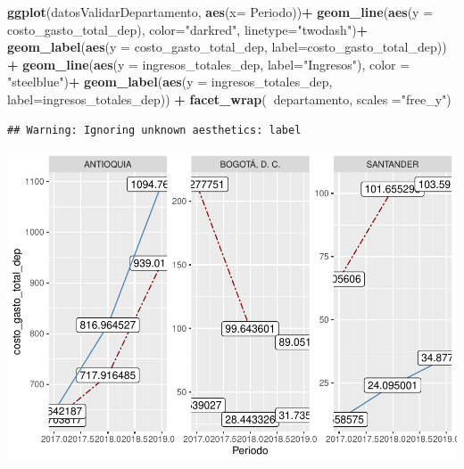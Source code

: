 \documentclass[
  11pt,
]{book}
\newenvironment{Shaded}{\begin{snugshade}}{\end{snugshade}}
\newcommand{\DataTypeTok}[1]{\textcolor[rgb]{0.13,0.29,0.53}{#1}}
\newcommand{\KeywordTok}[1]{\textcolor[rgb]{0.13,0.29,0.53}{\textbf{#1}}}
\newcommand{\NormalTok}[1]{#1}
\newcommand{\OperatorTok}[1]{\textcolor[rgb]{0.81,0.36,0.00}{\textbf{#1}}}
\newcommand{\StringTok}[1]{\textcolor[rgb]{0.31,0.60,0.02}{#1}}
\begin{document}
\begin{Shaded}
\begin{Highlighting}[]
\KeywordTok{ggplot}\NormalTok{(datosValidarDepartamento, }\KeywordTok{aes}\NormalTok{(}\DataTypeTok{x=}\NormalTok{ Periodo))}\OperatorTok{+}
\StringTok{  }\KeywordTok{geom_line}\NormalTok{(}\KeywordTok{aes}\NormalTok{(}\DataTypeTok{y =}\NormalTok{ costo_gasto_total_dep), }\DataTypeTok{color=}\StringTok{"darkred"}\NormalTok{, }\DataTypeTok{linetype=}\StringTok{"twodash"}\NormalTok{)}\OperatorTok{+}
\StringTok{  }\KeywordTok{geom_label}\NormalTok{(}\KeywordTok{aes}\NormalTok{(}\DataTypeTok{y =}\NormalTok{ costo_gasto_total_dep, }\DataTypeTok{label=}\NormalTok{costo_gasto_total_dep)) }\OperatorTok{+}\StringTok{ }
\StringTok{  }\KeywordTok{geom_line}\NormalTok{(}\KeywordTok{aes}\NormalTok{(}\DataTypeTok{y =}\NormalTok{ ingresos_totales_dep, }\DataTypeTok{label=}\StringTok{"Ingresos"}\NormalTok{), }\DataTypeTok{color =} \StringTok{"steelblue"}\NormalTok{)}\OperatorTok{+}
\StringTok{  }\KeywordTok{geom_label}\NormalTok{(}\KeywordTok{aes}\NormalTok{(}\DataTypeTok{y =}\NormalTok{ ingresos_totales_dep, }\DataTypeTok{label=}\NormalTok{ingresos_totales_dep)) }\OperatorTok{+}\StringTok{ }
\StringTok{  }\KeywordTok{facet_wrap}\NormalTok{(}\OperatorTok{~}\NormalTok{departamento, }\DataTypeTok{scales =}\StringTok{"free_y"}\NormalTok{)}
\end{Highlighting}
\end{Shaded}

\begin{verbatim}
## Warning: Ignoring unknown aesthetics: label
\end{verbatim}

\includegraphics{index_files/figure-latex/unnamed-chunk-31-1.pdf}
\end{document}
